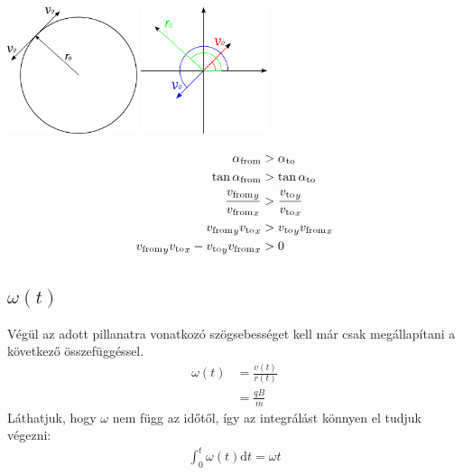 \documentclass[a4paper]{article}
\newcommand{\dd}[1]{\mathrm{d}#1}
\begin{document}
\begin{multicols}{2}
		\begin{center}
			\includegraphics[height=10em]{graphics/direction.pdf}
			\quad
			\includegraphics[height=10em]{graphics/direction origo.pdf}
		\end{center}
		\begin{align*}
			\alpha_{\mathrm{from}} &> \alpha_{\mathrm{to}} \\
			\tan{\alpha_{\mathrm{from}}} &> \tan{\alpha_{\mathrm{to}}} \\
			\frac{{v_{\mathrm{from}}}_y}{{v_{\mathrm{from}}}_x} &> \frac{{v_{\mathrm{to}}}_y}{{v_{\mathrm{to}}}_x} \\
			{v_{\mathrm{from}}}_y {v_{\mathrm{to}}}_x &> {v_{\mathrm{to}}}_y {v_{\mathrm{from}}}_x \\
			{v_{\mathrm{from}}}_y {v_{\mathrm{to}}}_x - {v_{\mathrm{to}}}_y {v_{\mathrm{from}}}_x &> 0
		\end{align*}

	\subsection{$\omega(t)$}
		Végül az adott pillanatra vonatkozó szögsebességet kell már csak megállapítani a következő összefüggéssel.
		\begin{align*}
			\omega(t) &= \frac{v(t)}{r(t)} \\
				&= \frac{q B}{m}
		\end{align*}
		Láthatjuk, hogy $\omega$ nem függ az időtől, így az integrálást könnyen el tudjuk végezni:
		\begin{align*}
			\int_{0}^{t} \omega(t) \dd{t} = \omega t
		\end{align*}


\end{multicols}
\end{document}
